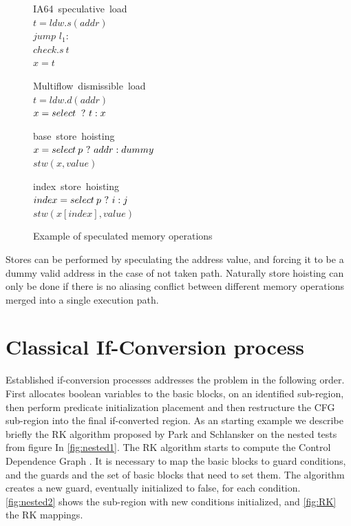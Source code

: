 \begin{figure}
\begin{minipage}[t]{4cm}
\mbox{IA64 speculative load} \\
$t = ldw.s(addr) $ \\
$jump$ $l_1:$ \\
$check.s\:t$ \\
$x = t$ \\
\end{minipage}
\begin{minipage}[t]{4cm}
\mbox{Multiflow dismissible load} \\
$t = ldw.d(addr) $ \\
$x = select\: ~?~ t : x $ \\
\end{minipage}

\begin{minipage}[t]{4cm}
\mbox{base store hoisting} \\
$x=select\:p ~?~ addr : dummy $ \\
$stw (x, value) $ \\
\end{minipage}
\begin{minipage}[t]{4cm}
\mbox{index store hoisting} \\
$index=select\:p ~?~ i : j $ \\
$stw (x[index], value) $ \\
\end{minipage}
\label{fig:spec}
\caption{Example of speculated memory operations}
\end{figure}

Stores can be performed by speculating the address value, and forcing it to be a dummy valid address in the case of not taken path. Naturally store hoisting can only be done if there is no aliasing conflict between different memory operations merged into a single execution path.

\section{Classical If-Conversion process}

Established if-conversion processes addresses the problem in the following order. First allocates boolean variables to the basic blocks, on an identified sub-region, then perform predicate initialization placement and then restructure the CFG sub-region into the final if-converted region. 
As an starting example we describe briefly the RK algorithm proposed by Park and Schlansker \cite{Schlansker-predicated} on the nested tests from figure In \ref{fig:nested1}. 
The RK algorithm starts to compute the Control Dependence Graph \cite{Ferrante:1987:PDG:24039.24041}. It is necessary to map the basic blocks to guard conditions, and the guards and the set of basic blocks that need to set them. The algorithm creates a new guard, eventually initialized to false, for each condition. \ref{fig:nested2} shows the sub-region with new conditions initialized, and \ref{fig:RK} the RK mappings.

